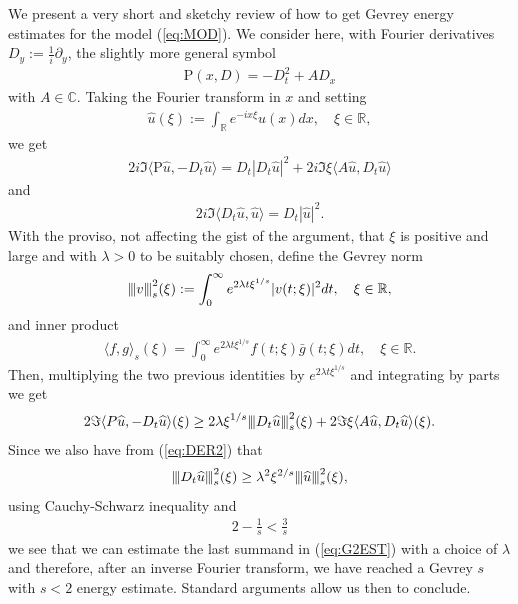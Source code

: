 \documentclass{article}
\newcommand{\wh}{\widehat}
\def\R{\mathbb{R}}
\def\C{\mathbb{C}}
\newcommand{\vertiii}[1]{{\left\vert\kern-0.25ex\left\vert\kern-0.25ex\left\vert #1 
    \right\vert\kern-0.25ex\right\vert\kern-0.25ex\right\vert}}
\begin{document}
We present a very short and sketchy review of how to get Gevrey energy estimates
for the model (\ref{eq:MOD}). We consider here, with Fourier
derivatives $ D_{y}:= \frac{1}{i}\partial_{y} $, the slightly more
general symbol
\begin{align*}
  \mathrm{P}(x,D) = -D_{t}^{2} + AD_{x}
\end{align*}
with $ A\in \C $. Taking the Fourier transform in $x$ and setting 
\begin{align*}
\wh u(\xi):= \int_{\R}e^{-ix\xi}u(x)dx,\quad \xi\in\mathbb{R}, 
\end{align*}
we get
\begin{align*}
  2i\Im \langle \mathrm{P}\wh u,-D_{t} \wh u \rangle = D_{t}|D_{t}\wh u|^{2} + 2i
  \Im \xi \langle A \wh u, D_{t}\wh u \rangle
\end{align*}
and
\begin{align}
  \label{eq:DER2}
  2i\Im \langle D_{t}\wh u, \wh u \rangle = D_{t}|\wh u|^{2}.
\end{align}
With the proviso, not affecting the gist of the argument,  that $ \xi $ is positive and large and with $ \lambda >0 $ to be suitably chosen, define the Gevrey norm
\begin{align*}
  \vertiii{v}_{s}^{2}(\xi):= \int_{0}^{\infty}e^{2\lambda t \xi^{1/s}}|v(t;\xi)|^{2}dt,\quad \xi\in\mathbb{R},
\end{align*}
and inner product
\begin{align*}
	\displaystyle \langle f, g
	\rangle_{s}(\xi) = \int_{0}^{\infty}e^{2\lambda t
		\xi^{1/s}}f(t;\xi)\bar{g}(t;\xi)dt ,\quad \xi\in\mathbb{R}.
\end{align*}
Then, multiplying the two previous identities by $ \displaystyle e^{2\lambda t
  \xi^{1/s}} $ and integrating by parts we get 
\begin{align}
  \label{eq:G2EST}
  2\Im\langle P \wh u ,-D_{t} \wh u \rangle(\xi) \geq 2 \lambda
  \xi^{1/s}\vertiii{D_{t}\wh u}_{s}^{2}(\xi) + 2
  \Im \xi \langle A \wh u, D_{t}\wh u \rangle(\xi).
\end{align}
Since we also have from (\ref{eq:DER2}) that
\begin{align*}
  \vertiii{D_{t}\wh u}_{s}^{2}(\xi) \geq \lambda^{2}\xi^{2/s}\vertiii{\wh u}_{s}^{2}(\xi),
\end{align*}
using Cauchy-Schwarz inequality and  
\begin{align*}
\displaystyle 2 -
\frac{1}{s} < \frac{3}{s} 
\end{align*}
we see that we can estimate the last
summand in (\ref{eq:G2EST}) with a choice of $ \lambda $ and therefore, after an inverse Fourier
transform,  we have reached a Gevrey $ s $
with $ s <2  $ energy estimate. Standard arguments allow us then to
conclude.
\end{document}
